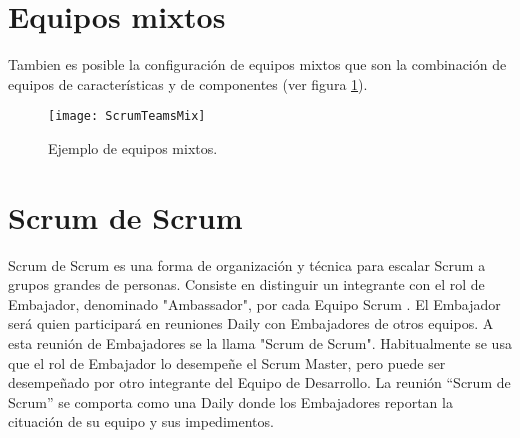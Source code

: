 \section{Equipos mixtos}

Tambien es posible la configuración de equipos mixtos que son la combinación de equipos de características y de componentes (ver figura \ref{fig:ScrumTeamsMix}).

\begin{figure}[h]
  \centering
  \texttt{[image: ScrumTeamsMix]}
  \caption{Ejemplo de equipos mixtos.}
  \centering
  \label{fig:ScrumTeamsMix} %
\end{figure}

\section{Scrum de Scrum}

Scrum de Scrum es una forma de organización y técnica para escalar Scrum a grupos grandes de personas. Consiste en distinguir un integrante con el rol de Embajador, denominado "Ambassador", por cada Equipo Scrum \cite{Stefanini-2013}. El Embajador será quien participará en reuniones Daily con Embajadores de otros equipos. A esta reunión de Embajadores se la llama "Scrum de Scrum". Habitualmente se usa que el rol de Embajador lo desempeñe el Scrum Master, pero puede ser desempeñado por otro integrante del Equipo de Desarrollo. La reunión “Scrum de Scrum” se comporta como una Daily donde los Embajadores reportan la cituación de su equipo y sus impedimentos.
